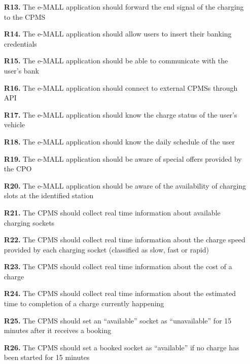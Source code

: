 \documentclass[12pt]{report}
\begin{document}
\begin{itemize}
    \item[\textbf{R13.}]The e-MALL application should forward the end signal of the charging to the CPMS
    
    \item[\textbf{R14.}]The e-MALL application should allow users to insert their banking credentials
    
    \item[\textbf{R15.}]The e-MALL application should be able to communicate with the user’s bank
    
    \item[\textbf{R16.}]The e-MALL application should connect to external CPMSs through API
    
    \item[\textbf{R17.}]The e-MALL application should know the charge status of the user’s vehicle
    
    \item[\textbf{R18.}]The e-MALL application should know the daily schedule of the user
    
    \item[\textbf{R19.}]The e-MALL application should be aware of special offers provided by the CPO
    
    \item[\textbf{R20.}]The e-MALL application should be aware of the availability of charging slots at the identified station
    
    \item[\textbf{R21.}]The CPMS should collect real time information about available charging sockets
    
    \item[\textbf{R22.}]The CPMS should collect real time information about the charge speed provided by each charging socket (classified as slow, fast or rapid)
    
    \item[\textbf{R23.}]The CPMS should collect real time information about the cost of a charge
    
    \item[\textbf{R24.}]The CPMS should collect real time information about the estimated time to completion of a charge currently happening
    
    \item[\textbf{R25.}]The CPMS should set an “available” socket as “unavailable” for 15 minutes after it receives a booking
    
    \item[\textbf{R26.}]The CPMS should set a booked socket as “available” if no charge has been started for 15 minutes
    

\end{itemize}
\end{document}
